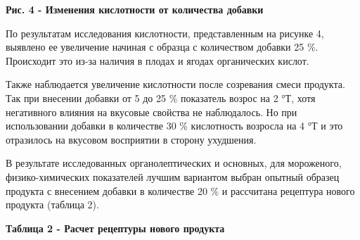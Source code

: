{{{\bfseries Рис. 4 - Изменения кислотности от количества добавки}

По результатам исследования кислотности, представленным на рисунке 4,
выявлено ее увеличение начиная с образца с количеством добавки 25 \%.
Происходит это из-за наличия в плодах и ягодах органических кислот.

Также наблюдается увеличение кислотности после созревания смеси
продукта. Так при внесении добавки от 5 до 25 \% показатель возрос на 2
°Т, хотя негативного влияния на вкусовые свойства не наблюдалось. Но при
использовании добавки в количестве 30 \% кислотность возросла на 4 °Т и
это отразилось на вкусовом восприятии в сторону ухудшения.

В результате исследованных органолептических и основных, для мороженого,
физико-химических показателей лучшим вариантом выбран опытный образец
продукта с внесением добавки в количестве 20 \% и рассчитана рецептура
нового продукта (таблица 2).

{\bfseries Таблица 2 - Расчет рецептуры нового продукта}

% 
% 
% 

}}
